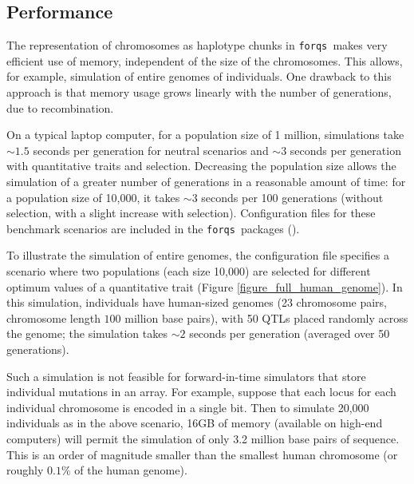 \documentclass{article}
\newcommand{\forqs}[0]{\texttt{forqs }}
\begin{document}
\subsection{Performance}

The representation of chromosomes as haplotype chunks in \forqs makes very
efficient use of memory, independent of the size of the chromosomes.  This
allows, for example, simulation of entire genomes of individuals.  One drawback
to this approach is that memory usage grows linearly with the number of
generations, due to recombination.

On a typical laptop computer, for a population size of 1 million, simulations
take ${\sim}1.5$ seconds per generation for neutral scenarios and ${\sim}3$
seconds per generation with quantitative traits and selection.  Decreasing the
population size allows the simulation of a greater number of generations in a
reasonable amount of time:  for a population size of 10,000, it takes ${\sim}3$
seconds per 100 generations (without selection, with a slight increase with
selection).  Configuration files for these benchmark scenarios are included in
the \forqs packages ().

To illustrate the simulation of entire genomes, the configuration file
 specifies a scenario
where two populations (each size 10,000) are selected for different optimum
values of a quantitative trait (Figure \ref{figure_full_human_genome}).  In
this simulation, individuals have human-sized genomes (23 chromosome pairs,
chromosome length $100$ million base pairs), with 50 QTLs placed randomly
across the genome; the simulation takes ${\sim}2$ seconds per generation
(averaged over 50 generations).  

Such a simulation is not feasible for forward-in-time simulators that store
individual mutations in an array.  For example, suppose that each locus for
each individual chromosome is encoded in a single bit.
Then to simulate 20,000 individuals as in the above scenario, 16GB
of memory (available on high-end computers) will permit the simulation of only
3.2 million base pairs of sequence.  This is an order of magnitude smaller than
the smallest human chromosome (or roughly $0.1 \%$ of the human genome).
\end{document}
